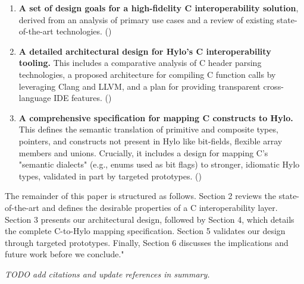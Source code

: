 \begin{enumerate}
    \item \textbf{A set of design goals for a high-fidelity C interoperability solution}, derived from an analysis of primary use cases and a review of existing state-of-the-art technologies. ()   
    \item \textbf{A detailed architectural design for Hylo's C interoperability tooling.} This includes a comparative analysis of C header parsing technologies, a proposed architecture for compiling C function calls by leveraging Clang and LLVM, and a plan for providing transparent cross-language IDE features. ()
    \item \textbf{A comprehensive specification for mapping C constructs to Hylo.} This defines the semantic translation of primitive and composite types, pointers, and constructs not present in Hylo like bit-fields, flexible array members and unions. Crucially, it includes a design for mapping C's "semantic dialects" (e.g., enums used as bit flags) to stronger, idiomatic Hylo types, validated in part by targeted prototypes. ()
\end{enumerate}

The remainder of this paper is structured as follows. Section 2 reviews the state-of-the-art and defines the desirable properties of a C interoperability layer. Section 3 presents our architectural design, followed by Section 4, which details the complete C-to-Hylo mapping specification. Section 5 validates our design through targeted prototypes. Finally, Section 6 discusses the implications and future work before we conclude."

\textit{TODO add citations and update references in summary.} 
    
    
    
    
